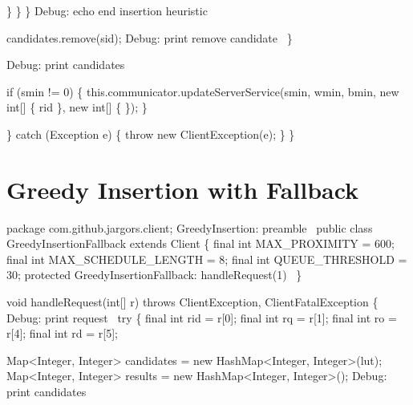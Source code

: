           \}
        \}
      \}
      \LA{}Debug: echo end insertion heuristic~{\nwtagstyle{}}\RA{}

      candidates.remove(sid);
      \LA{}Debug: print remove candidate~{\nwtagstyle{}}\RA{}
    \}

    \LA{}Debug: print candidates~{\nwtagstyle{}}\RA{}

    if (smin != 0) \{
      this.communicator.updateServerService(smin, wmin, bmin,
          new int[] \{ rid \}, new int[] \{ \});
    \}

  \} catch (Exception e) \{
    throw new ClientException(e);
  \}
\}
\nwendcode{}\nwdocspar

\section{Greedy Insertion with Fallback}

\nwenddocs{}\endmoddef\nwstartdeflinemarkup\nwenddeflinemarkup
package com.github.jargors.client;
\LA{}GreedyInsertion: preamble~{\nwtagstyle{}}\RA{}
public class GreedyInsertionFallback extends Client \{
  final int MAX_PROXIMITY = 600;
  final int MAX_SCHEDULE_LENGTH = 8;
  final int QUEUE_THRESHOLD = 30;
  protected \LA{}GreedyInsertionFallback: handleRequest(1)~{\nwtagstyle{}}\RA{}
\}
\nwendcode{}\nwdocspar

\nwenddocs{}\endmoddef\nwstartdeflinemarkup{}\nwenddeflinemarkup
void handleRequest(int[] r) throws ClientException, ClientFatalException \{
  \LA{}Debug: print request~{\nwtagstyle{}}\RA{}
  try \{
    final int rid = r[0];
    final int rq  = r[1];
    final int ro  = r[4];
    final int rd  = r[5];

    Map<Integer, Integer> candidates = new HashMap<Integer, Integer>(lut);
    Map<Integer, Integer> results = new HashMap<Integer, Integer>();
    \LA{}Debug: print candidates~{\nwtagstyle{}}\RA{}


